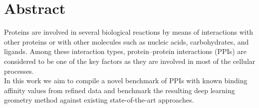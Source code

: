 \section{Abstract}
Proteins are involved in several biological reactions by means of interactions with other proteins or
with other molecules such as nucleic acids, carbohydrates, and ligands. Among these interaction
types, protein–protein interactions (PPIs) are considered to be one of the key factors as they are
involved in most of the cellular processes. \\
In this work we aim to compile a novel benchmark of PPIs with known binding affinity values from refined data and benchmark the resulting deep learning geometry method against existing state-of-the-art approaches.